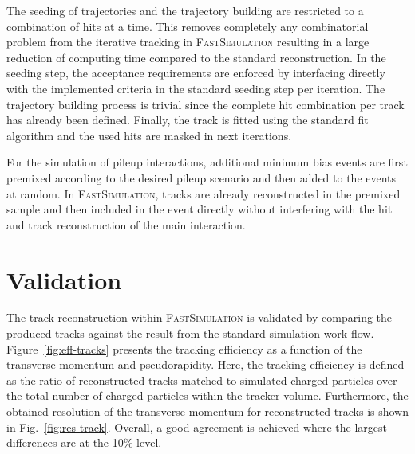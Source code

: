 \documentclass[a4paper]{jpconf}
\begin{document}
The seeding of trajectories and the trajectory building are restricted to a combination of hits at a time. This removes completely any combinatorial problem from the iterative tracking in \textsc{FastSimulation} resulting in a large reduction of computing time compared to the standard reconstruction. In the seeding step, the acceptance requirements are enforced by interfacing directly with the implemented criteria in the standard seeding step per iteration. The trajectory building process is trivial since the complete hit combination per track has already been defined. Finally, the track is fitted using the standard fit algorithm and the used hits are masked in next iterations.

For the simulation of pileup interactions, additional minimum bias events are first premixed according to the desired pileup scenario and then added to the events at random. In \textsc{FastSimulation}, tracks are already reconstructed in the premixed sample and then included in the event directly without interfering with the hit and track reconstruction of the main interaction.


\section{Validation}

The track reconstruction within \textsc{FastSimulation} is validated by comparing the produced tracks against the result from the standard simulation work flow. Figure~\ref{fig:eff-tracks} presents the tracking efficiency as a function of the transverse momentum and pseudorapidity. Here, the tracking efficiency is defined as the ratio of reconstructed tracks matched to simulated charged particles over the total number of charged particles within the tracker volume. Furthermore, the obtained resolution of the transverse momentum for reconstructed tracks is shown in Fig.~\ref{fig:res-track}. Overall, a good agreement is achieved where the largest differences are at the 10\% level.
\end{document}
